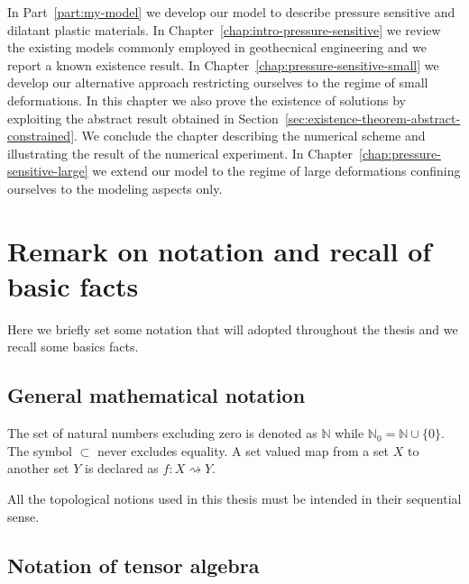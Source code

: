 \documentclass[a4paper,10pt,twoside]{amsbook}
\numberwithin{section}{chapter}
\numberwithin{equation}{chapter}
\theoremstyle{definition}
\begin{document}
In Part~\ref{part:my-model} we develop our model to describe pressure sensitive and dilatant plastic materials. In Chapter~\ref{chap:intro-pressure-sensitive} we review the existing models commonly employed in geothecnical engineering and we report a known existence result. In Chapter~\ref{chap:pressure-sensitive-small} we develop our alternative approach restricting ourselves to the regime of small deformations. In this chapter we also prove the existence of solutions by exploiting the abstract result obtained in Section~\ref{sec:existence-theorem-abstract-constrained}. We conclude the chapter describing the numerical scheme and illustrating the result of the numerical experiment. In Chapter~\ref{chap:pressure-sensitive-large} we extend our model to the regime of large deformations confining ourselves to the modeling aspects only.

\section*{Remark on notation and recall of basic facts}

Here we briefly set some notation that will adopted throughout the thesis and we recall some basics facts.

\subsection*{General mathematical notation}

The set of natural numbers excluding zero is denoted as $\mathbb{N}$ while $\mathbb{N}_0=\mathbb{N}\cup\{0\}$. The symbol $\subset$ never excludes equality. A set valued map from a set $X$ to another set $Y$ is declared as $f\colon X\rightsquigarrow Y$.

All the topological notions used in this thesis must be intended in their sequential sense.

\subsection*{Notation of tensor algebra}
\end{document}
